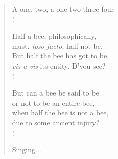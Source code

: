 \begin{verse}
A one, two, a one two three four \\!

Half a bee, philosophically, \\
\vin must, \emph{ipso facto}, half not be. \\
But half the bee has got to be, \\
\vin \emph{vis a vis} its entity.  D'you see? \\!

But can a bee be said to be \\
\vin or not to be an entire bee, \\
\vin when half the bee is not a bee, \\
\vin due to some ancient injury? \\!

Singing... \\
\end{verse}
